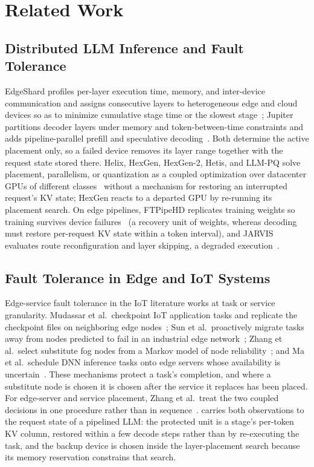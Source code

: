 \section{Related Work}\label{sec:related}

\subsection{Distributed LLM Inference and Fault Tolerance}

EdgeShard profiles per-layer execution time, memory, and inter-device
communication and assigns consecutive layers to heterogeneous edge and cloud
devices so as to minimize cumulative stage time or the slowest
stage~\cite{zhang2024edgeshard}; Jupiter partitions decoder layers under
memory and token-between-time constraints and adds pipeline-parallel prefill
and speculative decoding~\cite{ye2025jupiter}.  Both determine the active
placement only, so a failed device removes its layer range together with the
request state stored there.  Helix, HexGen, HexGen-2, Hetis, and LLM-PQ
solve placement, parallelism, or quantization as a coupled optimization over
datacenter GPUs of different classes~\cite{mei2025helix,jiang2024hexgen,
jiang2025hexgen2,mo2025hetis,zhao2024llmpq} without a mechanism for restoring
an interrupted request's KV state; HexGen reacts to a departed GPU by
re-running its placement search.  On edge pipelines, FTPipeHD replicates
training weights so training survives device failures~\cite{chen2024ftpipehd}
(a recovery unit of weights, whereas decoding must restore per-request KV
state within a token interval), and JARVIS evaluates route reconfiguration
and layer skipping, a degraded execution~\cite{sirera2024jarvis}.

\subsection{Fault Tolerance in Edge and IoT Systems}

Edge-service fault tolerance in the IoT literature works at task or service
granularity.  Mudassar et al.\ checkpoint IoT application tasks and replicate
the checkpoint files on neighboring edge nodes~\cite{mudassar2022adaptive};
Sun et al.\ proactively migrate tasks away from nodes predicted to fail in
an industrial edge network~\cite{sun2025robustness}; Zhang et al.\ select substitute fog nodes
from a Markov model of node reliability~\cite{zhang2022faulttolerant}; and Ma
et al.\ schedule DNN inference tasks onto edge servers whose availability is
uncertain~\cite{ma2023reliability}.  These mechanisms protect a task's completion, and where a substitute node
is chosen it is chosen after the service it replaces has been placed.  For
edge-server and service placement, Zhang et al.\ treat the two coupled
decisions in one procedure rather than in sequence~\cite{zhang2022joint}.  \sys{} carries both observations to the
request state of a pipelined LLM: the protected unit is a stage's per-token
KV column, restored within a few decode steps rather than by re-executing
the task, and the backup device is chosen inside the layer-placement search
because its memory reservation constrains that search.

